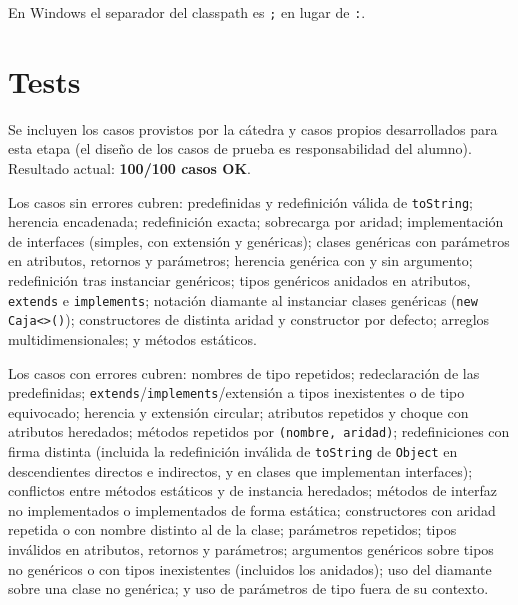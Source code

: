 \documentclass[11pt,a4paper]{article}
\begin{document}
En Windows el separador del classpath es \texttt{;} en lugar de \texttt{:}.

\section{Tests}

Se incluyen los casos provistos por la cátedra y casos propios desarrollados para
esta etapa (el diseño de los casos de prueba es responsabilidad del alumno).
Resultado actual: \textbf{100/100 casos OK}.

Los casos sin errores cubren: predefinidas y redefinición válida de
\texttt{toString}; herencia encadenada; redefinición exacta; sobrecarga por aridad;
implementación de interfaces (simples, con extensión y genéricas); clases genéricas
con parámetros en atributos, retornos y parámetros; herencia genérica con y sin
argumento; redefinición tras instanciar genéricos; tipos genéricos anidados en
atributos, \texttt{extends} e \texttt{implements}; notación diamante al instanciar
clases genéricas (\texttt{new Caja<>()}); constructores de distinta aridad
y constructor por defecto; arreglos multidimensionales; y métodos estáticos.

Los casos con errores cubren: nombres de tipo repetidos; redeclaración de las
predefinidas; \texttt{extends}/\texttt{implements}/extensión a tipos inexistentes o
de tipo equivocado; herencia y extensión circular; atributos repetidos y choque con
atributos heredados; métodos repetidos por \texttt{(nombre, aridad)};
redefiniciones con firma distinta (incluida la redefinición inválida de
\texttt{toString} de \texttt{Object} en descendientes directos e indirectos, y en
clases que implementan interfaces); conflictos entre métodos estáticos y de
instancia heredados; métodos de interfaz no implementados o implementados de forma
estática; constructores con aridad repetida o con nombre distinto al de la clase;
parámetros repetidos; tipos inválidos en atributos, retornos y parámetros;
argumentos genéricos sobre tipos no genéricos o con tipos inexistentes (incluidos
los anidados); uso del diamante sobre una clase no genérica; y uso de
parámetros de tipo fuera de su contexto.
\end{document}
